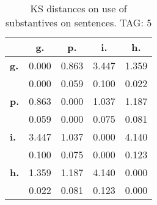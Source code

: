 \begin{table}[h!]
\begin{center}
\begin{tabular}{| l || c | c | c | c |}\hline
 & {\bf g.} & {\bf p.} & {\bf i.} & {\bf h.} \\\hline\hline
{\bf g.} & 0.000 & 0.863 & 3.447 & 1.359 \\
{\bf } & 0.000 & 0.059 & 0.100 & 0.022 \\\hline
{\bf p.} & 0.863 & 0.000 & 1.037 & 1.187 \\
{\bf } & 0.059 & 0.000 & 0.075 & 0.081 \\\hline
{\bf i.} & 3.447 & 1.037 & 0.000 & 4.140 \\
{\bf } & 0.100 & 0.075 & 0.000 & 0.123 \\\hline
{\bf h.} & 1.359 & 1.187 & 4.140 & 0.000 \\
{\bf } & 0.022 & 0.081 & 0.123 & 0.000 \\\hline
\end{tabular}
\caption{KS distances on use of substantives on sentences. TAG: 5}
\end{center}
\end{table}